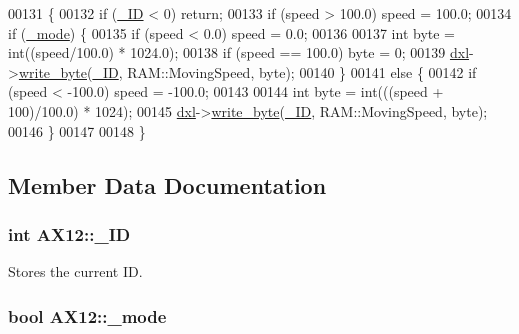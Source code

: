 \begin{DoxyCode}
00131 \{
00132     \textcolor{keywordflow}{if} (\hyperlink{class_a_x12_a0ae2b35fee3d120075e1d8f1e2055804}{\_ID} < 0) \textcolor{keywordflow}{return};
00133     \textcolor{keywordflow}{if} (speed > 100.0) speed = 100.0;
00134     \textcolor{keywordflow}{if} (\hyperlink{class_a_x12_a2fd07e2e636003227a32d09d211bd6d4}{\_mode}) \{
00135         \textcolor{keywordflow}{if} (speed < 0.0) speed = 0.0;
00136         
00137         \textcolor{keywordtype}{int} byte = int((speed/100.0) * 1024.0);
00138         \textcolor{keywordflow}{if} (speed == 100.0) byte = 0;
00139         \hyperlink{class_a_x12_af48e370f92f69214a27618d5b69bcfe8}{dxl}->\hyperlink{classdynamixel_a66c1e32cc45dd46d329f1fc212e46a3d}{write\_byte}(\hyperlink{class_a_x12_a0ae2b35fee3d120075e1d8f1e2055804}{\_ID}, RAM::MovingSpeed, byte);        
00140     \}
00141     \textcolor{keywordflow}{else} \{
00142         \textcolor{keywordflow}{if} (speed < -100.0) speed = -100.0;   
00143         
00144         \textcolor{keywordtype}{int} byte = int(((speed + 100)/100.0) * 1024);
00145         \hyperlink{class_a_x12_af48e370f92f69214a27618d5b69bcfe8}{dxl}->\hyperlink{classdynamixel_a66c1e32cc45dd46d329f1fc212e46a3d}{write\_byte}(\hyperlink{class_a_x12_a0ae2b35fee3d120075e1d8f1e2055804}{\_ID}, RAM::MovingSpeed, byte);
00146     \}
00147 
00148 \}
\end{DoxyCode}


\subsection{Member Data Documentation}
\hypertarget{class_a_x12_a0ae2b35fee3d120075e1d8f1e2055804}{}
\subsubsection[{\+\_\+\+I\+D}]{\setlength{\rightskip}{0pt plus 5cm}int A\+X12\+::\+\_\+\+I\+D\hspace{0.3cm}{\ttfamily [private]}}\label{class_a_x12_a0ae2b35fee3d120075e1d8f1e2055804}


Stores the current I\+D. 

\hypertarget{class_a_x12_a2fd07e2e636003227a32d09d211bd6d4}{}
\subsubsection[{\+\_\+mode}]{\setlength{\rightskip}{0pt plus 5cm}bool A\+X12\+::\+\_\+mode\hspace{0.3cm}{\ttfamily [private]}}\label{class_a_x12_a2fd07e2e636003227a32d09d211bd6d4}


